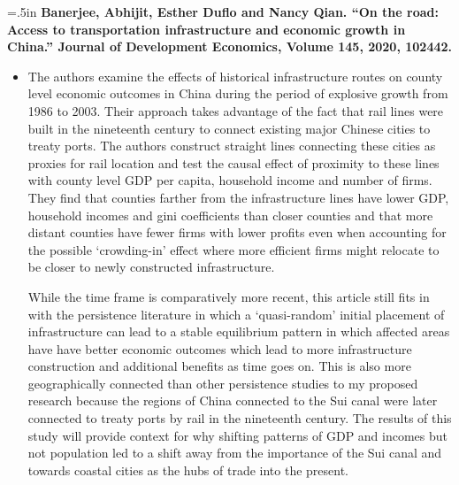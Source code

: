 \documentclass[11pt]{article}
\begin{document}
\hangindent=.5in
\textbf{Banerjee, Abhijit, Esther Duflo and Nancy Qian. “On the road: Access to transportation infrastructure and economic growth in China.” Journal of Development Economics, Volume 145, 2020, 102442.}
\begin{itemize}
    \item [~]
    The authors examine the effects of historical infrastructure routes on county level economic outcomes in China during the period of explosive growth from 1986 to 2003. Their approach takes advantage of the fact that rail lines were built in the nineteenth century to connect existing major Chinese cities to treaty ports. The authors construct straight lines connecting these cities as proxies for rail location and test the causal effect of proximity to these lines with county level GDP per capita, household income and number of firms. They find that counties farther from the infrastructure lines have lower GDP, household incomes and gini coefficients than closer counties and that more distant counties have fewer firms with lower profits even when accounting for the possible ‘crowding-in’ effect where more efficient firms might relocate to be closer to newly constructed infrastructure. 
    
    While the time frame is comparatively more recent, this article still fits in with the persistence literature in which a ‘quasi-random’ initial placement of infrastructure can lead to a stable equilibrium pattern in which affected areas have have better economic outcomes which lead to more infrastructure construction and additional benefits as time goes on. This is also more geographically connected than other persistence studies to my proposed research because the regions of China connected to the Sui canal were later connected to treaty ports by rail in the nineteenth century. The results of this study will provide context for why shifting patterns of GDP and incomes but not population led to a shift away from the importance of the Sui canal and towards coastal cities as the hubs of trade into the present. 

\end{itemize}
\end{document}
